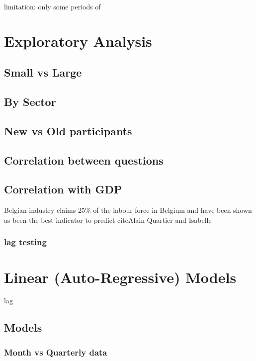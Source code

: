 \documentclass[12pt,a4paper,oneside]{book}
\begin{document}
limitation: only some periods of 


\chapter{Exploratory Analysis}


\section{Small vs Large}


\section{By Sector}


\section{New vs Old participants}


\section{Correlation between questions}
 

\section{Correlation with GDP}

Belgian industry claims 25\% of the labour force in Belgium and have been shown as been the best indicator to predict cite{Alain Quartier and Isabelle}


\subsection{lag testing}



\chapter{Linear (Auto-Regressive) Models}



lag

\section{Models}

\subsection{Month vs Quarterly data}
\end{document}
